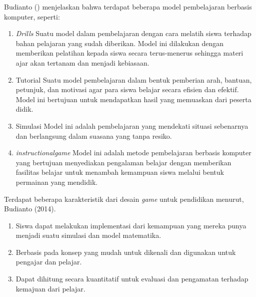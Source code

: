 	Budianto (\citeyear{paper.anung}) menjelaskan bahwa terdapat beberapa model pembelajaran berbasis komputer, seperti:
	\begin{enumerate}
		\item \textit{Drills}
			\subitem Suatu model dalam pembelajaran dengan cara melatih siswa terhadap bahan pelajaran yang sudah diberikan. Model ini dilakukan dengan memberikan pelatihan kepada siswa secara terus-menerus sehingga materi ajar akan tertanam dan menjadi kebiasaan.
		\item Tutorial
			\subitem Suatu model pembelajaran dalam bentuk pemberian arah, bantuan, petunjuk, dan motivasi agar para siswa belajar secara efisien dan efektif. Model ini bertujuan untuk mendapatkan hasil yang memuaskan dari peserta didik.
		\item Simulasi
			\subitem Model ini adalah pembelajaran yang mendekati situasi sebenarnya dan berlangsung dalam suasana yang tanpa resiko.
		\item \textit{instructionalgame}
			\subitem Model ini adalah metode pembelajaran berbasis komputer yang bertujuan menyediakan pengalaman belajar dengan memberikan fasilitas belajar untuk menambah kemampuan siswa melalui bentuk permainan yang mendidik.
	\end{enumerate}
	
	Terdapat beberapa karakteristik dari desain \textit{game} untuk pendidikan menurut, Budianto (2014).
	\begin{enumerate}
		\item Siswa dapat melakukan implementasi dari kemampuan yang mereka punya menjadi suatu simulasi dan model matematika.
		\item Berbasis pada konsep yang mudah untuk dikenali dan digunakan untuk pengajar dan pelajar.
		\item Dapat dihitung secara kuantitatif untuk evaluasi dan pengamatan terhadap kemajuan dari pelajar.
	\end{enumerate}
	
